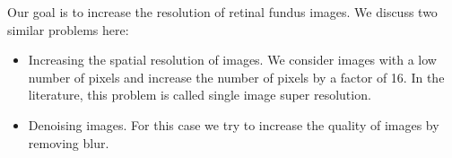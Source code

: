 \documentclass{scrartcl}
\begin{document}




Our goal is to increase the resolution of retinal fundus images.
We discuss two similar problems here:
\begin{itemize}
\item Increasing the spatial resolution of images.
  We consider images with a low number of pixels and increase the number of pixels by a factor of 16.
  In the literature, this problem is called single image super resolution.
\item Denoising images.
  For this case we try to increase the quality of images by removing blur.
\end{itemize}
\end{document}
